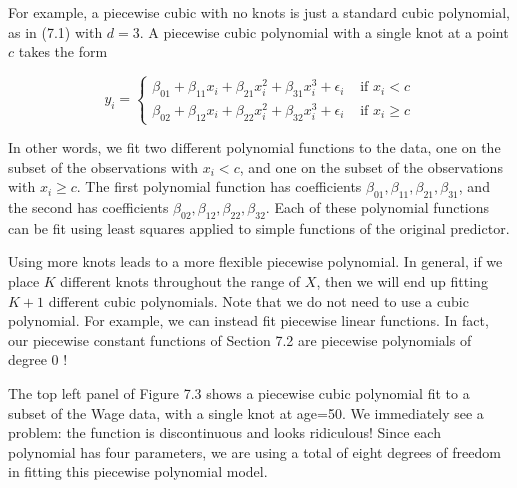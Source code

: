 \documentclass[10pt]{article}
\begin{document}
For example, a piecewise cubic with no knots is just a standard cubic polynomial, as in (7.1) with $d=3$. A piecewise cubic polynomial with a single knot at a point $c$ takes the form

$$
y_{i}= \begin{cases}\beta_{01}+\beta_{11} x_{i}+\beta_{21} x_{i}^{2}+\beta_{31} x_{i}^{3}+\epsilon_{i} & \text { if } x_{i}<c \\ \beta_{02}+\beta_{12} x_{i}+\beta_{22} x_{i}^{2}+\beta_{32} x_{i}^{3}+\epsilon_{i} & \text { if } x_{i} \geq c\end{cases}
$$

In other words, we fit two different polynomial functions to the data, one on the subset of the observations with $x_{i}<c$, and one on the subset of the observations with $x_{i} \geq c$. The first polynomial function has coefficients $\beta_{01}, \beta_{11}, \beta_{21}, \beta_{31}$, and the second has coefficients $\beta_{02}, \beta_{12}, \beta_{22}, \beta_{32}$. Each of these polynomial functions can be fit using least squares applied to simple functions of the original predictor.

Using more knots leads to a more flexible piecewise polynomial. In general, if we place $K$ different knots throughout the range of $X$, then we will end up fitting $K+1$ different cubic polynomials. Note that we do not need to use a cubic polynomial. For example, we can instead fit piecewise linear functions. In fact, our piecewise constant functions of Section 7.2 are piecewise polynomials of degree 0 !

The top left panel of Figure 7.3 shows a piecewise cubic polynomial fit to a subset of the Wage data, with a single knot at age=50. We immediately see a problem: the function is discontinuous and looks ridiculous! Since each polynomial has four parameters, we are using a total of eight degrees of freedom in fitting this piecewise polynomial model.
\end{document}
